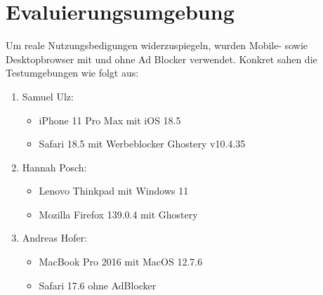 \documentclass{article}
\begin{document}
	\section{Evaluierungsumgebung}
	Um reale Nutzungsbedigungen widerzuspiegeln, wurden Mobile- sowie Desktopbrowser mit und ohne Ad Blocker verwendet. Konkret sahen die Testumgebungen wie folgt aus:
	\begin{enumerate}
		\item{Samuel Ulz:}
		\begin{itemize}
			\item{iPhone 11 Pro Max mit iOS 18.5}
			\item{Safari 18.5 mit Werbeblocker Ghostery v10.4.35}
		\end{itemize}
		\item{Hannah Posch:}
		\begin{itemize}
			\item{Lenovo Thinkpad mit Windows 11}
			\item{Mozilla Firefox 139.0.4 mit Ghostery}
		\end{itemize}
		\item{Andreas Hofer:}
		\begin{itemize}
			\item{MacBook Pro 2016 mit MacOS 12.7.6}
			\item{Safari 17.6 ohne AdBlocker}
		\end{itemize}
	\end{enumerate}
	























  
\end{document}
